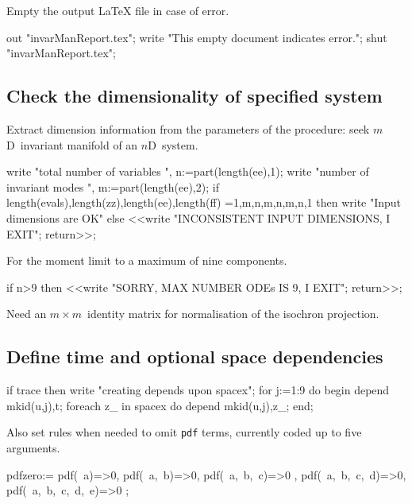 \documentclass[11pt,a5paper]{article}
\begin{document}
Empty the output LaTeX file in case of error.
\begin{reduce}
out "invarManReport.tex";
write "This empty document indicates error.";
shut "invarManReport.tex";
\end{reduce}


 


\subsection{Check the dimensionality of specified system}
Extract dimension information from the parameters of the
procedure: seek $m$D~invariant manifold of an $n$D~system.
\begin{reduce}
write "total number of variables ",
n:=part(length(ee),1);
write "number of invariant modes ",
m:=part(length(ee),2);
if {length(evals),length(zz),length(ee),length(ff)}
  ={{1,m},{n,m},{n,m},{n,1}} 
  then write "Input dimensions are OK" 
  else <<write "INCONSISTENT INPUT DIMENSIONS, I EXIT"; 
      return>>;
\end{reduce}

For the moment limit to a maximum of nine components.
\begin{reduce}
if n>9 then <<write "SORRY, MAX NUMBER ODEs IS 9, I EXIT"; 
    return>>;
\end{reduce}

Need an \(m\times m\)~identity matrix for normalisation of
the isochron projection.



\subsection{Define time and optional space dependencies}
\begin{reduce}
if trace then write "creating depends upon spacex";
for j:=1:9 do begin
    depend mkid(u,j),t;
    foreach z_ in spacex do depend mkid(u,j),z_;
end;
\end{reduce}
Also set rules when needed to omit \verb|pdf| terms,
currently coded up to five arguments.
\begin{reduce}
pdfzero:={ pdf(~a)=>0, pdf(~a,~b)=>0, pdf(~a,~b,~c)=>0
    , pdf(~a,~b,~c,~d)=>0, pdf(~a,~b,~c,~d,~e)=>0 };
\end{reduce}
\end{document}
